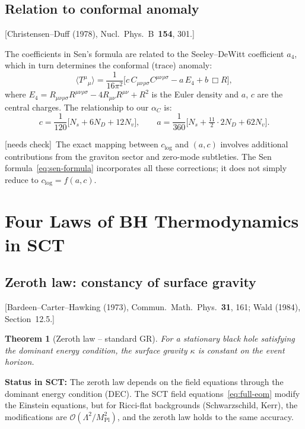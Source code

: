 \documentclass[12pt,a4paper]{article}
\newtheorem{theorem}[proposition]{Theorem}
\theoremstyle{definition}
\theoremstyle{remark}
\newcommand{\Rsq}{R_{\mu\nu\rho\sigma}R^{\mu\nu\rho\sigma}}
\newcommand{\Ricsq}{R_{\mu\nu}R^{\mu\nu}}
\newcommand{\Weylsq}{C_{\mu\nu\rho\sigma}C^{\mu\nu\rho\sigma}}
\newcommand{\fromlit}[1]{\textcolor{blue!70!black}{\textsf{[#1]}}}
\newcommand{\needscheck}{\textcolor{orange!80!black}{\textsf{[needs check]}}}
\begin{document}
\subsection{Relation to conformal anomaly}
\fromlit{Christensen--Duff (1978), Nucl.\ Phys.\ B~\textbf{154}, 301.}

The coefficients in Sen's formula are related to the
Seeley--DeWitt coefficient $a_4$, which in turn determines the
conformal (trace) anomaly:
\begin{equation}
  \langle T^\mu{}_\mu \rangle
  = \frac{1}{16\pi^2}\bigl[c\,\Weylsq - a\,E_4
  + b\,\Box R\bigr],
\end{equation}
where $E_4 = \Rsq - 4\Ricsq + R^2$ is the Euler density and
$a$, $c$ are the central charges.  The relationship to our
$\alpha_C$ is:
\begin{equation}
  c = \frac{1}{120}\bigl[N_s + 6N_D + 12N_v\bigr],
  \qquad
  a = \frac{1}{360}\bigl[N_s + \tfrac{11}{2}\cdot 2N_D + 62N_v\bigr].
\end{equation}

\needscheck\ The exact mapping between $c_{\log}$ and $(a, c)$ involves
additional contributions from the graviton sector and zero-mode
subtleties.  The Sen formula~\eqref{eq:sen-formula} incorporates all
these corrections; it does not simply reduce to $c_{\log} = f(a, c)$.


\section{Four Laws of BH Thermodynamics in SCT}
\label{sec:four-laws}

\subsection{Zeroth law: constancy of surface gravity}
\fromlit{Bardeen--Carter--Hawking (1973), Commun.\ Math.\ Phys.\
\textbf{31}, 161; Wald (1984), Section~12.5.}

\begin{theorem}[Zeroth law -- standard GR]
For a stationary black hole satisfying the dominant energy condition,
the surface gravity $\kappa$ is constant on the event horizon.
\end{theorem}

\textbf{Status in SCT:} The zeroth law depends on the field equations
through the dominant energy condition (DEC).  The SCT field
equations~\eqref{eq:full-eom} modify the Einstein equations, but
for Ricci-flat backgrounds (Schwarzschild, Kerr), the modifications
are $\mathcal{O}(\Lambda^2/M_{\mathrm{Pl}}^2)$, and the zeroth
law holds to the same accuracy.
\end{document}
